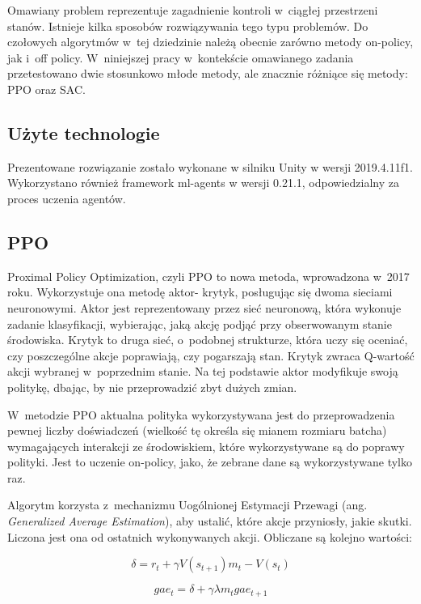 \documentclass[a4paper,12pt]{article}
\begin{document}
Omawiany problem reprezentuje zagadnienie kontroli w~ciągłej przestrzeni stanów. Istnieje kilka sposobów rozwiązywania tego typu problemów. Do czołowych algorytmów w~tej dziedzinie należą obecnie zarówno metody on-policy, jak i~off policy. W~niniejszej pracy w~kontekście omawianego zadania przetestowano dwie stosunkowo młode metody, ale znacznie różniące się metody: PPO oraz SAC.

\subsection{Użyte technologie}
Prezentowane rozwiązanie zostało wykonane w silniku Unity w wersji 2019.4.11f1. Wykorzystano również framework ml-agents w wersji 0.21.1, odpowiedzialny za proces uczenia agentów.

\subsection{PPO}
Proximal Policy Optimization, czyli PPO to nowa metoda, wprowadzona w~2017 roku. Wykorzystuje ona metodę aktor- krytyk, posługując się dwoma sieciami neuronowymi. Aktor jest reprezentowany przez sieć neuronową, która wykonuje zadanie klasyfikacji, wybierając, jaką akcję podjąć przy obserwowanym stanie środowiska. Krytyk to druga sieć, o~podobnej strukturze, która uczy się oceniać, czy poszczególne akcje poprawiają, czy pogarszają stan. Krytyk zwraca Q-wartość akcji wybranej w~poprzednim stanie. Na tej podstawie aktor modyfikuje swoją politykę, dbając, by nie przeprowadzić zbyt dużych zmian.

W~metodzie PPO aktualna polityka wykorzystywana jest do przeprowadzenia pewnej liczby doświadczeń (wielkość tę określa się mianem rozmiaru batcha) wymagających interakcji ze środowiskiem, które wykorzystywane są do poprawy polityki. Jest to uczenie on-policy, jako, że zebrane dane są wykorzystywane tylko raz.

Algorytm korzysta z~mechanizmu Uogólnionej Estymacji Przewagi (ang. \textit{Generalized Average Estimation}), aby ustalić, które akcje przyniosły, jakie skutki. Liczona jest ona od ostatnich wykonywanych akcji. Obliczane są kolejno wartości:

\begin{equation}
	\delta = r_t + \gamma V(s_{t+1})m_t - V(s_t)
\end{equation}

\begin{equation}
	gae_t = \delta + \gamma \lambda m_t gae_{t+1}
\end{equation}
\end{document}
